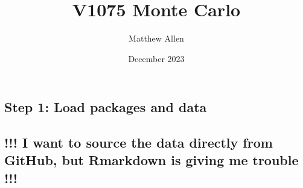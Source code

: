 \documentclass[
]{article}
\title{V1075 Monte Carlo}
\author{Matthew Allen}
\date{December 2023}
\begin{document}
\maketitle

\hypertarget{step-1-load-packages-and-data}{%
\subsection{Step 1: Load packages and
data}\label{step-1-load-packages-and-data}}

\hypertarget{i-want-to-source-the-data-directly-from-github-but-rmarkdown-is-giving-me-trouble}{%
\subsection{!!! I want to source the data directly from GitHub, but
Rmarkdown is giving me trouble
!!!}\label{i-want-to-source-the-data-directly-from-github-but-rmarkdown-is-giving-me-trouble}}
\end{document}
